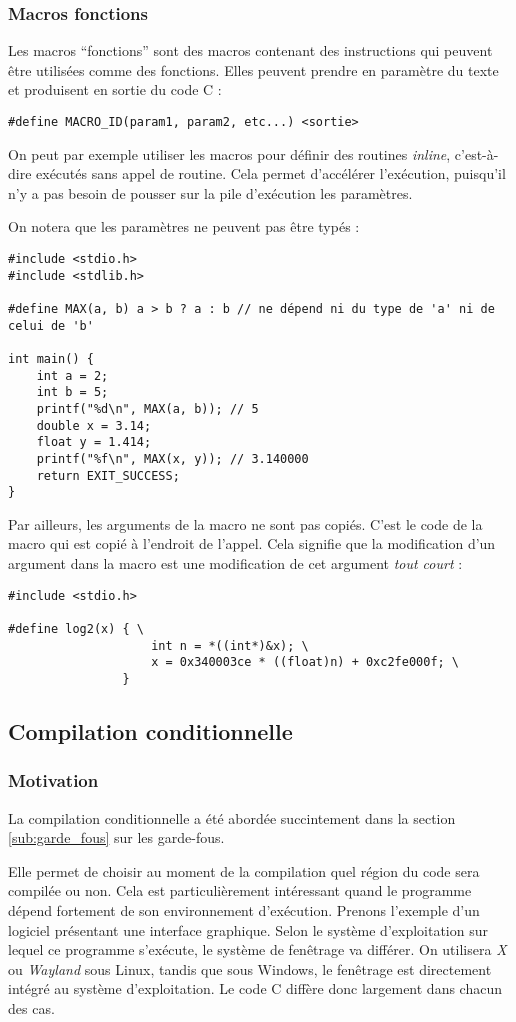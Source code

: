 \documentclass[../../../main.tex]{subfiles}
\begin{document}
\subsubsection{Macros fonctions}\label{ssub:macros_fonctions}
Les macros ``fonctions'' sont des macros contenant des instructions qui peuvent être utilisées comme des fonctions. Elles peuvent prendre en paramètre du texte et produisent en sortie du code C :
\begin{verbatim}
#define MACRO_ID(param1, param2, etc...) <sortie>
\end{verbatim}
On peut par exemple utiliser les macros pour définir des routines \textit{inline}, c'est-à-dire exécutés sans appel de routine. Cela permet d'accélérer l'exécution, puisqu'il n'y a pas besoin de pousser sur la pile d'exécution les paramètres.

On notera que les paramètres ne peuvent pas être typés :
\begin{verbatim}
#include <stdio.h>
#include <stdlib.h>

#define MAX(a, b) a > b ? a : b // ne dépend ni du type de 'a' ni de celui de 'b'

int main() {
	int a = 2;
	int b = 5;
	printf("%d\n", MAX(a, b)); // 5
	double x = 3.14;
	float y = 1.414;
	printf("%f\n", MAX(x, y)); // 3.140000
	return EXIT_SUCCESS;
}
\end{verbatim}
Par ailleurs, les arguments de la macro ne sont pas copiés. C'est le code de la macro qui est copié à l'endroit de l'appel. Cela signifie que la modification d'un argument dans la macro est une modification de cet argument \textit{tout court} :
\begin{verbatim}
#include <stdio.h>

#define log2(x) { \
					int n = *((int*)&x); \
					x = 0x340003ce * ((float)n) + 0xc2fe000f; \
				}

\end{verbatim}
\subsection{Compilation conditionnelle} \label{sub:compilation_conditionnelle}
\subsubsection{Motivation}
La compilation conditionnelle a été abordée succintement dans la section \ref{sub:garde_fous} sur les garde-fous.

Elle permet de choisir au moment de la compilation quel région du code sera compilée ou non. Cela est particulièrement intéressant quand le programme dépend fortement de son environnement d'exécution. Prenons l'exemple d'un logiciel présentant une interface graphique. Selon le système d'exploitation sur lequel ce programme s'exécute, le système de fenêtrage va différer. On utilisera \textit{X} ou \textit{Wayland} sous Linux, tandis que sous Windows, le fenêtrage est directement intégré au système d'exploitation. Le code C diffère donc largement dans chacun des cas.
\end{document}
